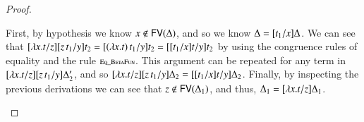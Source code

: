 \documentclass{elsarticle}
\renewcommand{\FILLdrulename}[1]{\scriptsize \textsc{#1}}
\begin{document}
\begin{proof}
\begin{report}
\begin{itemize}
First, by hypothesis we know $ \mathit{x}  \not\in \mathsf{FV}(  \Delta  ) $, and so we know $\Delta  =  [  \mathit{t_{{\mathrm{1}}}}  /  \mathit{x}  ]  \Delta$.  We can see
that $[   \lambda  \mathit{x}  .  \mathit{t}   /  \mathit{z}  ]  [  \mathit{z} \, \mathit{t_{{\mathrm{1}}}}  /  \mathit{y}  ]  \mathit{t_{{\mathrm{2}}}}  =  [   (  \lambda  \mathit{x}  .  \mathit{t}  )  \, \mathit{t_{{\mathrm{1}}}}  /  \mathit{y}  ]  \mathit{t_{{\mathrm{2}}}} = [  [  \mathit{t_{{\mathrm{1}}}}  /  \mathit{x}  ]  \mathit{t}  /  \mathit{y}  ]  \mathit{t_{{\mathrm{2}}}}$ by using the congruence rules
of equality and the rule $\FILLdrulename{Eq\_BetaFun}$.  This argument can be repeated for any term
in $[   \lambda  \mathit{x}  .  \mathit{t}   /  \mathit{z}  ]  [  \mathit{z} \, \mathit{t_{{\mathrm{1}}}}  /  \mathit{y}  ]  \Delta'_{{\mathrm{2}}}$, and so $[   \lambda  \mathit{x}  .  \mathit{t}   /  \mathit{z}  ]  [  \mathit{z} \, \mathit{t_{{\mathrm{1}}}}  /  \mathit{y}  ]  \Delta_{{\mathrm{2}}}  =  [  [  \mathit{t_{{\mathrm{1}}}}  /  \mathit{x}  ]  \mathit{t}  /  \mathit{y}  ]  \Delta_{{\mathrm{2}}}$.  Finally, by inspecting the previous
derivations we can see that $ \mathit{z}  \not\in \mathsf{FV}(  \Delta_{{\mathrm{1}}}  ) $, and thus, $\Delta_{{\mathrm{1}}}  =  [   \lambda  \mathit{x}  .  \mathit{t}   /  \mathit{z}  ]  \Delta_{{\mathrm{1}}}$.  


\end{itemize}
\end{report}
\end{proof}
\end{document}
